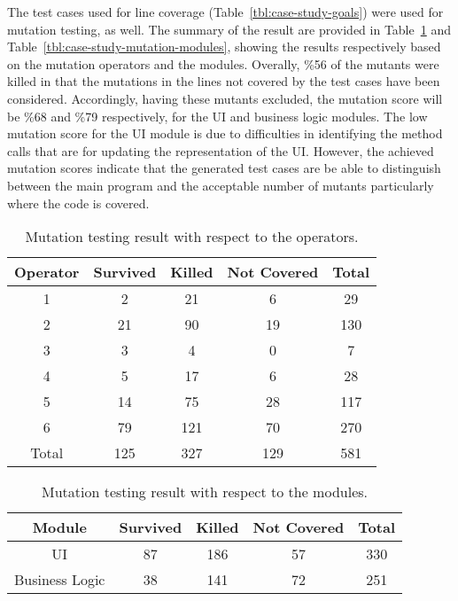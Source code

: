 The test cases used for line coverage (Table~\ref{tbl:case-study-goals}) were used for mutation testing, as well. The summary of the result are provided in Table~\ref{tbl:case-study-mutation-operators} and Table~\ref{tbl:case-study-mutation-modules}, showing the results respectively based on the mutation operators and the modules. Overally, \%56 of the mutants were killed in that the mutations in the lines not covered by the test cases have been considered. Accordingly, having these mutants excluded, the mutation score will be \%68 and \%79 respectively, for the UI and business logic modules. The low mutation score for the UI module is due to difficulties in identifying the method calls that are for updating the representation of the UI. 
However, the achieved mutation scores indicate that the generated test cases are be able to distinguish between the main program and the acceptable number of mutants particularly where the code is covered.

\begin{table}[!t]
\caption{Mutation testing result with respect to the operators.}
\label{tbl:case-study-mutation-operators}
\centering
\begin{tabular}{|c|c|c|c|c|}
\hline
Operator & Survived & Killed & Not Covered & Total \\ \hline
1 & 2 & 21 & 6 & 29 \\ \hline
2 & 21 & 90 & 19 & 130  \\ \hline
3 & 3 & 4 & 0 & 7 \\ \hline
4 & 5 & 17 & 6 & 28 \\ \hline
5 & 14 & 75 & 28 & 117 \\ \hline
6 & 79 & 121 & 70 & 270 \\ \hline\hline
Total & 125 & 327 & 129 & 581 \\
\hline
\end{tabular}
\end{table}

\begin{table}[!t]
\caption{Mutation testing result with respect to the modules.}
\label{tbl:case-study-mutation-module}
\centering
\begin{tabular}{|c|c|c|c|c|}
\hline
Module & Survived & Killed & Not Covered & Total \\ \hline
UI & 87 & 186 & 57 & 330 \\ \hline
Business Logic & 38 & 141 & 72 & 251 \\
\hline
\end{tabular}
\end{table}

